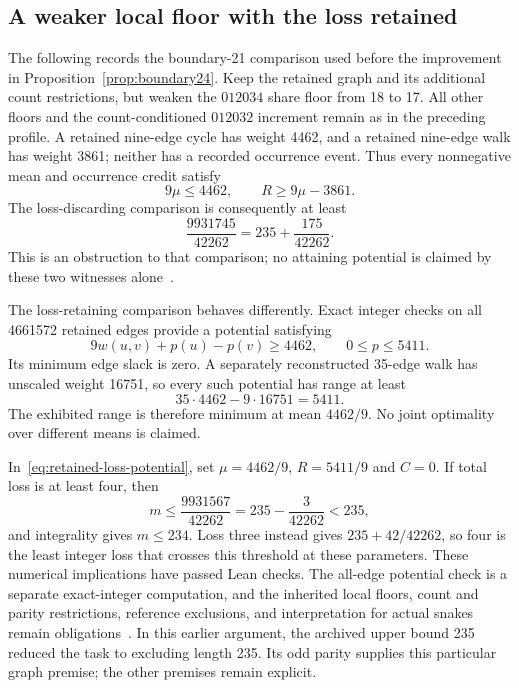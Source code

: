 \documentclass[11pt,a4paper]{article}
\theoremstyle{definition}
\theoremstyle{remark}
\begin{document}
\subsection{A weaker local floor with the loss retained}\label{sec:retained-loss-comparison}
The following records the boundary-21 comparison used before the improvement
in Proposition~\ref{prop:boundary24}. Keep the retained graph and its additional count restrictions, but weaken
the $012034$ share floor from 18 to 17. All other floors and the
count-conditioned $012032$ increment remain as in the preceding profile.
A retained nine-edge cycle has weight 4462, and a retained nine-edge walk
has weight 3861; neither has a recorded occurrence event. Thus every
nonnegative mean and occurrence credit satisfy
\[
9\mu\le4462,\qquad R\ge9\mu-3861.
\]
The loss-discarding comparison is consequently at least
\[
\frac{9931745}{42262}=235+\frac{175}{42262}.
\]
This is an obstruction to that comparison; no attaining potential is
claimed by these two witnesses alone~\cite{floor158archive}.

The loss-retaining comparison behaves differently. Exact integer checks
on all 4661572 retained edges provide a potential satisfying
\[
9w(u,v)+p(u)-p(v)\ge4462,\qquad 0\le p\le5411.
\]
Its minimum edge slack is zero. A separately reconstructed 35-edge walk
has unscaled weight 16751, so every such potential has range at least
\[
35\cdot4462-9\cdot16751=5411.
\]
The exhibited range is therefore minimum at mean $4462/9$. No joint
optimality over different means is claimed.

In~\eqref{eq:retained-loss-potential}, set $\mu=4462/9$, $R=5411/9$
and $C=0$. If total loss is at least four, then
\[
m\le\frac{9931567}{42262}=235-\frac3{42262}<235,
\]
and integrality gives $m\le234$. Loss three instead gives
$235+42/42262$, so four is the least integer loss that crosses this
threshold at these parameters. These numerical implications have passed
Lean checks. The all-edge potential check is a separate exact-integer
computation, and the inherited local floors, count and parity restrictions,
reference exclusions, and interpretation for actual snakes remain
obligations~\cite{loss164archive,threshold165archive}.
In this earlier argument, the archived upper bound 235 reduced the task
to excluding length 235. Its odd parity supplies this particular graph
premise; the other premises remain explicit.
\end{document}
